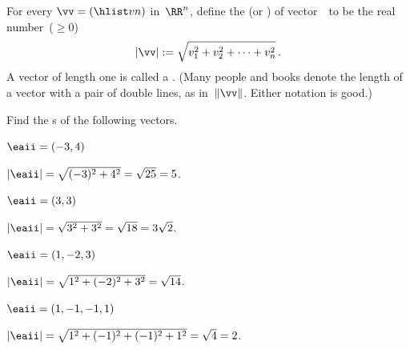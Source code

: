 \begin{definition}[Pythagoras] \label{def:veclen}
For every  \(\vv=(\hlist vn)\) in~\(\RR^n\),
define the  (or ) of vector~\vv\  to be the real number~(\(\geq0\))
\begin{equation*}
|\vv|:=\sqrt{v_1^2+v_2^2+\cdots+v_n^2}\,.
\end{equation*}
A vector of length one is called a .
(Many people and books denote the length of a vector with a pair of double lines, as in~\(\|\vv\|\).  Either notation is good.)
\end{definition}

\begin{example} 
Find the s of the following vectors.
\begin{Parts}
\item \(\eaii=(-3,4)\)
\begin{solution} 
\(|\eaii|=\sqrt{(-3)^2+4^2}=\sqrt{25}=5\). 
\end{solution}

\begin{reduce}
\item \(\eaii=(3,3)\)
\begin{solution} 
\(|\eaii|=\sqrt{3^2+3^2}=\sqrt{18}=3\sqrt2\). 
\end{solution}
\end{reduce}

\item \(\eaii=(1,-2,3)\)
\begin{solution} 
\(|\eaii|=\sqrt{1^2+(-2)^2+3^2}=\sqrt{14}\). 
\end{solution}

\begin{reduce}
\item \(\eaii=(1,-1,-1,1)\)
\begin{solution} 
\(|\eaii|=\sqrt{1^2+(-1)^2+(-1)^2+1^2}=\sqrt4=2\).
\end{solution}
\end{reduce}

\end{Parts}
\end{example}


